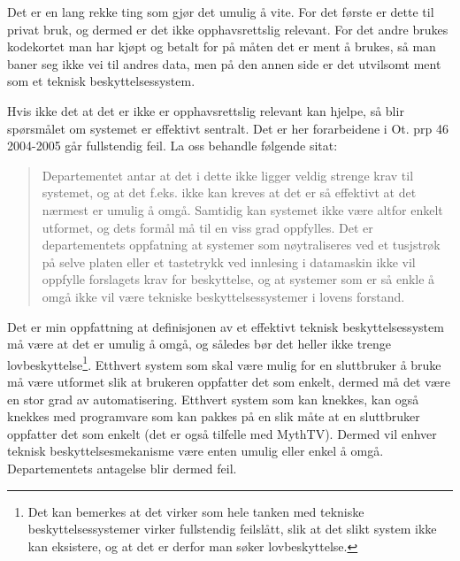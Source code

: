 \documentclass[11pt,norsk,a4paper]{article}
\begin{document}
Det er en lang rekke ting som gjør det umulig å vite. For det første
er dette til privat bruk, og dermed er det ikke opphavsrettslig
relevant. For det andre brukes kodekortet man har kjøpt og betalt for
på måten det er ment å brukes, så man baner seg ikke vei til andres
data, men på den annen side er det utvilsomt ment som et teknisk
beskyttelsessystem.

Hvis ikke det at det er ikke er opphavsrettslig relevant kan hjelpe,
så blir spørsmålet om systemet er effektivt sentralt. Det er her
forarbeidene i Ot. prp 46 2004-2005 går fullstendig feil. La oss
behandle følgende sitat:

\begin{quote}
Departementet antar at det i dette ikke ligger veldig strenge krav til
systemet, og at det f.eks. ikke kan kreves at det er så effektivt at
det nærmest er umulig å omgå. Samtidig kan systemet ikke være altfor
enkelt utformet, og dets formål må til en viss grad oppfylles. Det er
departementets oppfatning at systemer som nøytraliseres ved et
tusjstrøk på selve platen eller et tastetrykk ved innlesing i
datamaskin ikke vil oppfylle forslagets krav for beskyttelse, og at
systemer som er så enkle å omgå ikke vil være tekniske
beskyttelsessystemer i lovens forstand.
\end{quote}

Det er min oppfattning at definisjonen av et effektivt teknisk
beskyttelsessystem må være at det er umulig å omgå, og således bør det
heller ikke trenge lovbeskyttelse\footnote{Det kan bemerkes at det
virker som hele tanken med tekniske beskyttelsessystemer virker
fullstendig feilslått, slik at det slikt system ikke kan eksistere, og
at det er derfor man søker lovbeskyttelse.}. Etthvert system som skal
være mulig for en sluttbruker å bruke må være utformet slik at
brukeren oppfatter det som enkelt, dermed må det være en stor grad av
automatisering. Etthvert system som kan knekkes, kan også knekkes med
programvare som kan pakkes på en slik måte at en sluttbruker oppfatter
det som enkelt (det er også tilfelle med MythTV). Dermed vil enhver
teknisk beskyttelsesmekanisme være enten umulig eller enkel å
omgå. Departementets antagelse blir dermed feil. 
\end{document}
